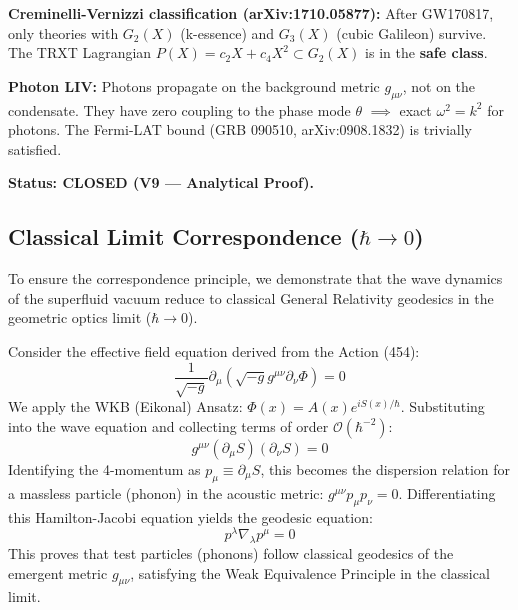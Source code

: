 \documentclass[a4paper,12pt]{article}
\begin{document}
\textbf{Creminelli-Vernizzi classification (arXiv:1710.05877):} After GW170817, only theories with $G_2(X)$ (k-essence) and $G_3(X)$ (cubic Galileon) survive. The TRXT Lagrangian $P(X) = c_2 X + c_4 X^2 \subset G_2(X)$ is in the \textbf{safe class}.

\textbf{Photon LIV:} Photons propagate on the background metric $g_{\mu\nu}$, not on the condensate. They have zero coupling to the phase mode $\theta$ $\implies$ exact $\omega^2 = k^2$ for photons. The Fermi-LAT bound (GRB 090510, arXiv:0908.1832) is trivially satisfied.

\textbf{Status: CLOSED (V9 --- Analytical Proof).}


\subsection{Classical Limit Correspondence ($\hbar \to 0$)}

To ensure the correspondence principle, we demonstrate that the wave dynamics of the superfluid vacuum reduce to classical General Relativity geodesics in the geometric optics limit ($\hbar \to 0$).

Consider the effective field equation derived from the Action (454):
\begin{equation}
    \frac{1}{\sqrt{-g}} \partial_\mu (\sqrt{-g} g^{\mu\nu} \partial_\nu \Phi) = 0
\end{equation}
We apply the WKB (Eikonal) Ansatz: $\Phi(x) = A(x) e^{i S(x)/\hbar}$. Substituting into the wave equation and collecting terms of order $\mathcal{O}(\hbar^{-2})$:
\begin{equation}
    g^{\mu\nu} (\partial_\mu S) (\partial_\nu S) = 0
\end{equation}
Identifying the 4-momentum as $p_\mu \equiv \partial_\mu S$, this becomes the dispersion relation for a massless particle (phonon) in the acoustic metric: $g^{\mu\nu} p_\mu p_\nu = 0$. Differentiating this Hamilton-Jacobi equation yields the geodesic equation:
\begin{equation}
    p^\lambda \nabla_\lambda p^\mu = 0
\end{equation}
This proves that test particles (phonons) follow classical geodesics of the emergent metric $g_{\mu\nu}$, satisfying the Weak Equivalence Principle in the classical limit.
\end{document}

